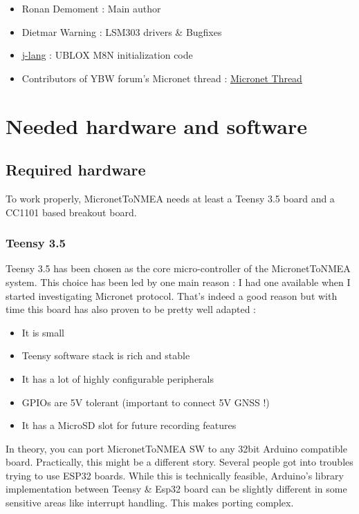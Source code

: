 \documentclass{report}
\begin{document}
\begin{itemize}
\item Ronan Demoment : Main author
\item Dietmar Warning : LSM303 drivers \& Bugfixes
\item \href{https://github.com/j-lang}{j-lang} : UBLOX M8N initialization code
\item Contributors of YBW forum's Micronet thread : \href{https://forums.ybw.com/index.php?threads/raymarines-micronet.539500/}{Micronet Thread}
\end{itemize}

\chapter{Needed hardware and software}

\section{Required hardware}

To work properly, MicronetToNMEA needs at least a Teensy 3.5 board and a CC1101 based breakout board.

\subsection{Teensy 3.5}
Teensy 3.5 has been chosen as the core micro-controller of the MicronetToNMEA system. This choice has been led by one main reason : I had one available when I started investigating Micronet protocol. That's indeed a good reason but with time this board has also proven to be pretty well adapted :

\begin{itemize}
	\item It is small
	\item Teensy software stack is rich and stable
	\item It has a lot of highly configurable peripherals
	\item GPIOs are 5V tolerant (important to connect 5V GNSS !)
	\item It has a MicroSD slot for future recording features
\end{itemize}

In theory, you can port MicronetToNMEA SW to any 32bit Arduino compatible board. Practically, this might be a different story. Several people got into troubles trying to use ESP32 boards. While this is technically feasible, Arduino's library implementation between Teensy \& Esp32 board can be slightly different in some sensitive areas like interrupt handling. This makes porting complex.
\end{document}
